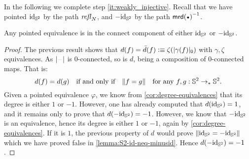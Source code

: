 \documentclass[english,a4]{article}
\newcommand{\ptdto}{\to_\ast}%
\newcommand{\setTrunc}[1]{\Trunc{#1}_0}
\newcommand{\settrunc}[1]{\trunc{#1}_0}
\begin{document}
In the following we complete step \ref{it:weakly_injective}. 
Recall that we have pointed $\mathord{\mathrm{id}}_{{\mathbb S^{2}}}$ by the path $\mathop{{\mathit{refl}}_{N}}$, 
and $-\mathord{\mathrm{id}}_{{\mathbb S^{2}}}$ by the path $\inv{\mrd(\base)}$.
\begin{corollary}
  Any pointed equivalence is in the connect component of either $\mathord{\mathrm{id}}_{{\mathbb S^{2}}}$ or $-\mathord{\mathrm{id}}_{{\mathbb S^{2}}}$.
  \label{cor:equivalence-conn-component}
\end{corollary}
\begin{proof}
  The previous result shows that $d(f) = \bar d(f) \defeq
  \zeta(\settrunc{\gamma(f)})$ with $\gamma, \zeta$ equivalences. As
  $\trunc\blank$ is $0$-connected, so is $d$, being a composition of
  $0$-connected maps. That is:
  \begin{displaymath}
    d(f) = d(g) \quad \text{if and only if}\quad
    \Trunc{f = g} \quad \text{for any}\ f,g:\Sp \ptdto\Sp.
  \end{displaymath}
  Given a pointed equivalence $\varphi$, we know from
  \cref{cor:degree-equivalences} that its degree is either $1$ or $-1$.
  However, one has already computed that $d(\mathord{\mathrm{id}}_{{\mathbb S^{2}}}) = 1$, and it remains only
  to prove that $d(-\mathord{\mathrm{id}}_{{\mathbb S^{2}}}) = -1$. However, we know that $-\mathord{\mathrm{id}}_{{\mathbb S^{2}}}$ is an
  equivalence, hence its degree is either $1$ or $-1$, again by
  \cref{cor:degree-equivalences}. If it is $1$, the previous property of $d$
  would prove $\lVert\mathord{\mathrm{id}}_{{\mathbb S^{2}}} = -\mathord{\mathrm{id}}_{{\mathbb S^{2}}}\rVert$ which we have proved false in
  \cref{lemma:S2-id-neq-minusid}. Hence $d(-\mathord{\mathrm{id}}_{{\mathbb S^{2}}}) = -1$.

\end{proof}
\end{document}
